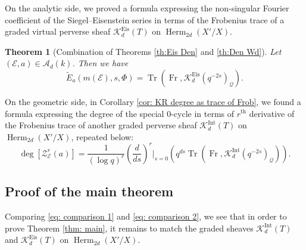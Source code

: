 \documentclass[reqno]{amsart}
\numberwithin{equation}{section}
\newcommand{\wt}[1]{\widetilde{#1}}
\newcommand{\Cal}[1]{\mathcal{#1}}
\newcommand{\mrm}[1]{\mathrm{#1}}
\DeclareMathOperator{\Frob}{Fr}
\DeclareMathOperator{\Tr}{Tr}
\DeclareMathOperator{\Eis}{Eis}
\DeclareMathOperator{\Herm}{Herm}
\DeclareMathOperator{\Int}{Int}
\newcommand\cA{\mathcal{A}}
\newcommand\cE{\mathcal{E}}
\newcommand\cK{\mathcal{K}}
\newcommand\cQ{\mathcal{Q}}
\newtheorem{thm}{Theorem}[section]
\theoremstyle{remark}
\numberwithin{equation}{section}
\begin{document}
 On the analytic side, we proved a formula expressing the non-singular Fourier coefficient of the Siegel--Eisenstein series in terms of the Frobenius trace of a graded virtual perverse sheaf $\cK_{d}^{\Eis}(T)$ on $\Herm_{2d}(X'/X)$.

\begin{thm}[Combination of Theorems \ref{th:Eis Den} and \ref{th:Den Wd}] Let $(\cE,a)\in \cA_{d}(k)$. Then we have 
\begin{equation}\label{eq: comparison 1}
\wt{E}_{a}(m(\cE),s,\Phi) =  \Tr(\Frob,\cK_{d}^{\Eis}(q^{-2s})_{\cQ}).
\end{equation}
\end{thm}


On the geometric side,  in Corollary \ref{cor: KR degree as trace of Frob}, we found a formula expressing the degree of the special $0$-cycle in terms of $r^{\mrm{th}}$ derivative of the Frobenius trace of another graded perverse sheaf $\cK^{\Int}_{d}(T)$ on $\Herm_{2d}(X'/X)$, repeated below: 
\begin{equation}\label{eq: comparison 2}
\deg [\Cal{Z}^{r}_{\Cal{E}}(a)] = \frac{1}{(\log q)^r} \left(\frac{d}{ds}\right)^r\Big|_{s=0} \left(q^{ds}\Tr(\Frob, \cK_d^{\mrm{Int}}(q^{-2s})_{\cQ})\right).
\end{equation}


\subsection{Proof of the main theorem} Comparing \eqref{eq: comparison 1} and \eqref{eq: comparison 2}, we see that in order to prove Theorem \ref{thm: main}, it remains to match the graded sheaves $\cK_d^{\mrm{Int}}(T)$ and $\cK_{d}^{\Eis}(T)$ on $\Herm_{2d}(X'/X)$.
\end{document}
